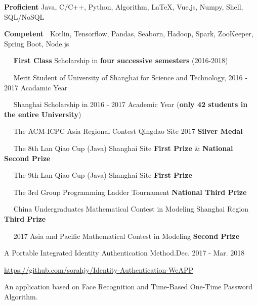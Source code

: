 \documentclass{sorahjy_cv}
\begin{document}


%
%

\begin{description}{}
	\item{\textbf{Proficient \quad }} Java, C/C++, Python, Algorithm, \LaTeX, Vue.js, Numpy, Shell, SQL/NoSQL
	\item{\textbf{Competent\ }} Kotlin, Tensorflow, Pandas, Seaborn, Hadoop, Spark, ZooKeeper, Spring Boot, Node.js
\end{description}


%
%

\begin{description}{}
	\item{\ \ } \textbf{First Class} Scholarship in \textbf{four successive semesters} (2016-2018)
	\item{\ \ } Merit Student of University of Shanghai for Science and Technology, 2016 - 2017 Acadamic Year
	\item{\ \ } Shanghai Scholarship in 2016 - 2017 Academic Year (\textbf{only 42 students in the entire University})
	\item{\ \ } The ACM-ICPC Asia Regional Contest Qingdao Site 2017 \textbf{Silver Medal}
	\item{\ \ } The 8th Lan Qiao Cup (Java) Shanghai Site \textbf{First Prize} \& \textbf{National Second Prize}
	\item{\ \ } The 9th Lan Qiao Cup (Java) Shanghai Site \textbf{First Prize}
	\item{\ \ } The 3rd Group Programming Ladder Tournament \textbf{National Third Prize}
	\item{\ \ } China Undergraduates Mathematical Contest in Modeling Shanghai Region \textbf{Third Prize}
	\item{\ \ } 2017 Asia and Pacific Mathematical Contest in Modeling \textbf{Second Prize}

\end{description}


%
%

\begin{sectionContentSimple}{A Portable Integrated Identity Authentication Method.}{Dec. 2017 - Mar. 2018}
	\item \url{https://github.com/sorahjy/Identity-Authentication-WeAPP}
	\item An application based on Face Recognition and Time-Based One-Time Password Algorithm.
\end{sectionContentSimple}
\end{document}
